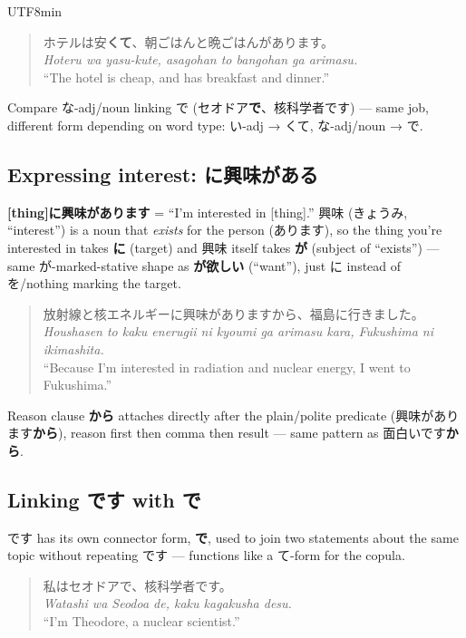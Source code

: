 \documentclass[11pt]{article}
\begin{document}
\begin{CJK}{UTF8}{min}
\begin{quote}
ホテルは安\textbf{くて}、朝ごはんと晩ごはんがあります。\\
\emph{Hoteru wa yasu-kute, asagohan to bangohan ga arimasu.}\\
``The hotel is cheap, and has breakfast and dinner.''
\end{quote}

Compare な-adj/noun linking で (セオドア\textbf{で}、核科学者です) --- same
job, different form depending on word type: い-adj → くて, な-adj/noun → で.

\subsection{Expressing interest: \texorpdfstring{に興味がある}{ni kyoumi ga aru}}
\textbf{[thing]に興味があります} = ``I'm interested in [thing].'' 興味
(きょうみ, ``interest'') is a noun that \emph{exists} for the person (あります),
so the thing you're interested in takes \textbf{に} (target) and 興味 itself
takes \textbf{が} (subject of ``exists'') --- same が-marked-stative shape as
\textbf{が欲しい} (``want''), just に instead of を/nothing marking the target.

\begin{quote}
放射線と核エネルギーに興味がありますから、福島に行きました。\\
\emph{Houshasen to kaku enerugii ni kyoumi ga arimasu kara, Fukushima ni
ikimashita.}\\
``Because I'm interested in radiation and nuclear energy, I went to
Fukushima.''
\end{quote}

Reason clause \textbf{から} attaches directly after the plain/polite
predicate (興味があります\textbf{から}), reason first then comma then result
--- same pattern as 面白いです\textbf{から}.

\subsection{Linking \texorpdfstring{です}{desu} with \texorpdfstring{で}{de}}
です has its own connector form, \textbf{で}, used to join two statements
about the same topic without repeating です --- functions like a て-form for
the copula.

\begin{quote}
私はセオドアで、核科学者です。\\
\emph{Watashi wa Seodoa de, kaku kagakusha desu.}\\
``I'm Theodore, a nuclear scientist.''
\end{quote}


\end{CJK}
\end{document}
